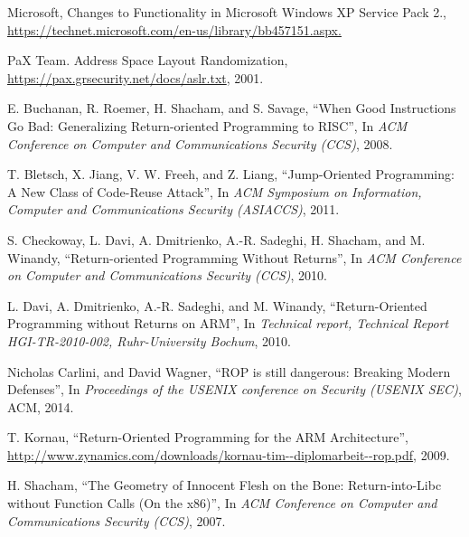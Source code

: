 \documentclass[11pt,a4paper,bibtotoc,idxtotoc,headsepline,footsepline,footexclude,BCOR20mm,DIV10]{scrbook}
\begin{document}
\begin{thebibliography}{50}
Microsoft, Changes to Functionality in Microsoft Windows XP Service Pack 2.,
\url{https://technet.microsoft.com/en-us/library/bb457151.aspx.}

PaX Team. Address Space Layout Randomization,
\url{https://pax.grsecurity.net/docs/aslr.txt}, 2001.

E. Buchanan, R. Roemer, H. Shacham, and S. Savage, 
``{When Good Instructions Go Bad: Generalizing Return-oriented Programming to RISC}'', In
\emph{ACM Conference on Computer and Communications Security (CCS)}, 2008.

T. Bletsch, X. Jiang, V. W. Freeh, and Z. Liang,
``{Jump-Oriented Programming: A New Class of Code-Reuse Attack}'', In
\emph{ACM Symposium on Information, Computer and Communications Security (ASIACCS)}, 2011.

S. Checkoway, L. Davi, A. Dmitrienko, A.-R. Sadeghi, H. Shacham, and M. Winandy,
``{Return-oriented Programming Without Returns}'', In
\emph{ACM Conference on Computer and Communications Security (CCS)}, 2010.

L. Davi, A. Dmitrienko, A.-R. Sadeghi, and M. Winandy,
``{Return-Oriented Programming without Returns on ARM}'', In
\emph{Technical report, Technical Report HGI-TR-2010-002, Ruhr-University Bochum}, 2010.

Nicholas Carlini, and David Wagner,
``{ROP is still dangerous: Breaking Modern Defenses}'', In
\emph{Proceedings of the USENIX conference on Security (USENIX SEC)}, ACM, 2014.

T. Kornau, 
``{Return-Oriented Programming for the ARM Architecture}'',
\url{http://www.zynamics.com/downloads/kornau-tim--diplomarbeit--rop.pdf}, 2009.

H. Shacham,
``{The Geometry of Innocent Flesh on the Bone: Return-into-Libc without Function Calls (On the x86)}'', In
\emph{ACM Conference on Computer and
Communications Security (CCS)}, 2007.





\end{thebibliography}
\end{document}
